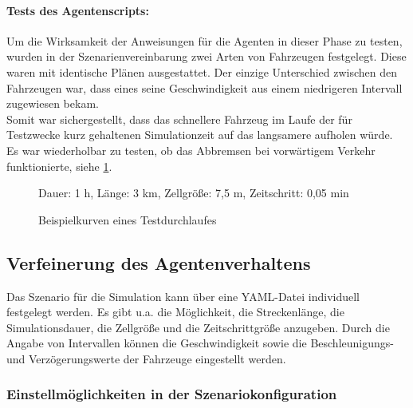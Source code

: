 \paragraph*{Tests des Agentenscripts:}
Um die Wirksamkeit der Anweisungen für die Agenten in dieser Phase zu testen, wurden in der Szenarienvereinbarung zwei Arten von Fahrzeugen festgelegt.
Diese waren mit identische Plänen ausgestattet.
Der einzige Unterschied zwischen den Fahrzeugen war, dass eines seine Geschwindigkeit aus einem niedrigeren Intervall zugewiesen bekam.
\\
Somit war sichergestellt, dass das schnellere Fahrzeug im Laufe der für Testzwecke kurz gehaltenen Simulationzeit auf das langsamere aufholen würde.
Es war wiederholbar zu testen, ob das Abbremsen bei vorwärtigem Verkehr funktionierte, siehe \cref{figure:test-cell-speedcurves}.

\begin{figure}[hptb]
  \centering 
   \qquad
  \caption{Beispielkurven eines Testdurchlaufes}{\footnotesize Dauer: 1 h, Länge: 3 km, Zellgröße: 7,5 m, Zeitschritt: 0,05 min} 
  \label{figure:test-cell-speedcurves}
\end{figure}






\subsection{Verfeinerung des Agentenverhaltens}
\label{sec:verfeinerung-agentenplan}

Das Szenario für die Simulation kann über eine YAML-Datei individuell festgelegt werden.
Es gibt u.a. die Möglichkeit, die Streckenlänge, die Simulationsdauer, die Zellgröße und die Zeitschrittgröße anzugeben. 
Durch die Angabe von Intervallen können die Geschwindigkeit sowie die Beschleunigungs- und Verzögerungswerte der Fahrzeuge eingestellt werden.



\subsubsection{Einstellmöglichkeiten in der Szenariokonfiguration}
\label{einstellungen-szenario}

